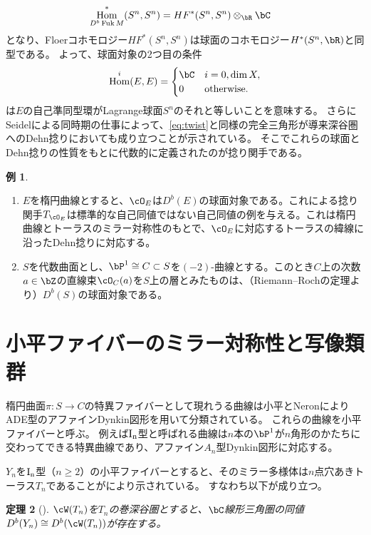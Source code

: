 \documentclass[uplatex,a4paper,dvipdfmx]{jsarticle}
\theoremstyle{plain}
\newtheorem{theorem}{定理}[section]
\theoremstyle{definition}
\newtheorem{example}[theorem]{例}
\DeclareMathOperator{\Hom}{\mathrm{Hom}}
\DeclareMathOperator{\Fuk}{Fuk}
\begin{document}
\begin{align}
	\Hom_{D^b\Fuk M}^*(S^n, S^n) & = HF^*(S^n, S^n)\otimes_\bR \bC
\end{align}
となり、Floerコホモロジー$HF^*(S^n, S^n)$は球面のコホモロジー$H^*(S^n, \bR)$と同型である。
よって、球面対象の2つ目の条件$$\Hom^i(E, E) = \begin{cases}
		\bC & i = 0, \dim X,    \\
		0   & \text{otherwise.}
	\end{cases}$$は$E$の自己準同型環がLagrange球面$S^n$のそれと等しいことを意味する。
さらにSeidelによる同時期の仕事\cite{MR1978046}によって、\eqref{eq:twist}と同様の完全三角形が導来深谷圏へのDehn捻りにおいても成り立つことが示されている。
そこでこれらの球面とDehn捻りの性質をもとに代数的に定義されたのが捻り関手である。
\begin{example}
	\begin{enumerate}
		\item $E$を楕円曲線とすると、$\cO_E$は$D^b(E)$の球面対象である。これによる捻り関手$T_{\cO_E}$は標準的な自己同値ではない自己同値の例を与える。これは楕円曲線とトーラスのミラー対称性のもとで、$\cO_E$に対応するトーラスの緯線に沿ったDehn捻りに対応する。
		\item $S$を代数曲面とし、$\bP^1 \cong C \subset S$を$(-2)$-曲線とする。このとき$C$上の次数$a \in \bZ$の直線束$\cO_C(a)$を$S$上の層とみたものは、（Riemann--Rochの定理より）$D^b(S)$の球面対象である。
	\end{enumerate}
\end{example}
\section{小平ファイバーのミラー対称性と写像類群}
楕円曲面$\pi \colon S \to C$の特異ファイバーとして現れうる曲線は小平とNeronによりADE型のアファインDynkin図形を用いて分類されている。
これらの曲線を小平ファイバーと呼ぶ。
例えば$\rm{I}_n$型と呼ばれる曲線は$n$本の$\bP^1$が$n$角形のかたちに交わってできる特異曲線であり、アファイン$A_n$型Dynkin図形に対応する。



$Y_n$を$\rm{I}_n$型（$n \geq 2$）の小平ファイバーとすると、そのミラー多様体は$n$点穴あきトーラス$T_n$であることが\cite{MR3663596}により示されている。
すなわち以下が成り立つ。
\begin{theorem}[\cite{MR3663596}]
	$\cW(T_n)$を$T_n$の巻深谷圏とすると、$\bC$線形三角圏の同値$D^b(Y_n) \cong D^b(\cW(T_n))$が存在する。
\end{theorem}
\end{document}
